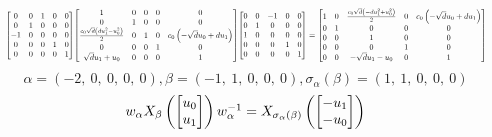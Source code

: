 \documentclass[11pt]{article}
\theoremstyle{definition}
\begin{document}
\[
\scaletoalign{\textwidth}{{\left[\begin{matrix}0 & 0 & 1 & 0 & 0\\0 & 1 & 0 & 0 & 0\\-1 & 0 & 0 & 0 & 0\\0 & 0 & 0 & 1 & 0\\0 & 0 & 0 & 0 & 1\end{matrix}\right]} {\left[\begin{matrix}1 & 0 & 0 & 0 & 0\\0 & 1 & 0 & 0 & 0\\\frac{c_{0} \sqrt{d} \left(d u_{1}^{2} - u_{0}^{2}\right)}{2} & 0 & 1 & 0 & c_{0} \left(- \sqrt{d} u_{0} + d u_{1}\right)\\0 & 0 & 0 & 1 & 0\\\sqrt{d} u_{1} + u_{0} & 0 & 0 & 0 & 1\end{matrix}\right]} {\left[\begin{matrix}0 & 0 & -1 & 0 & 0\\0 & 1 & 0 & 0 & 0\\1 & 0 & 0 & 0 & 0\\0 & 0 & 0 & 1 & 0\\0 & 0 & 0 & 0 & 1\end{matrix}\right]} = {\left[\begin{matrix}1 & 0 & \frac{c_{0} \sqrt{d} \left(- d u_{1}^{2} + u_{0}^{2}\right)}{2} & 0 & c_{0} \left(- \sqrt{d} u_{0} + d u_{1}\right)\\0 & 1 & 0 & 0 & 0\\0 & 0 & 1 & 0 & 0\\0 & 0 & 0 & 1 & 0\\0 & 0 & - \sqrt{d} u_{1} - u_{0} & 0 & 1\end{matrix}\right]}}
\]
\[
\alpha = \left( -2, \  0, \  0, \  0, \  0\right), \beta = \left( -1, \  1, \  0, \  0, \  0\right), \sigma_{\alpha}(\beta) = \left( 1, \  1, \  0, \  0, \  0\right)
\]
\[
\scaletoalign{\textwidth}{w_{\alpha} X_{\beta}\left(\left[\begin{matrix}u_{0}\\u_{1}\end{matrix}\right]\right) w_{\alpha}^{-1} = X_{\sigma_{\alpha}\left(\beta\right)}\left(\left[\begin{matrix}- u_{1}\\- u_{0}\end{matrix}\right]\right)}
\]
\end{document}
